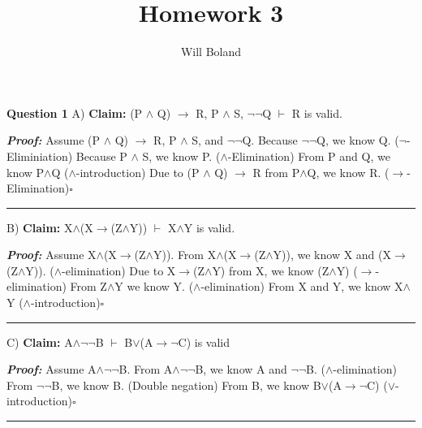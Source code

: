 \documentclass{article}
\begin{document}
\title{Homework 3}
\author{Will Boland}
\maketitle

\textbf{Question 1}\newline\newline
A) \textbf{Claim: } (P $\wedge$ Q) $\rightarrow$ R, P $\wedge$ S, $\neg$$\neg$Q $\vdash$ R is valid.\newline

\textbf{\textit{Proof: }}\newline
Assume (P $\wedge$ Q) $\rightarrow$ R, P $\wedge$ S, and $\neg$$\neg$Q.\newline
Because $\neg$$\neg$Q, we know Q. ($\neg$-Eliminiation)\newline
Because P $\wedge$ S, we know P. ($\wedge$-Elimination)\newline
From P and Q, we know P$\wedge$Q ($\wedge$-introduction)\newline
Due to (P $\wedge$ Q) $\rightarrow$ R from P$\wedge$Q, we know R. ($\rightarrow$-Elimination)$\square$\newline\rule{10cm}{1pt}\newline



B) \textbf{Claim: } X$\wedge$(X$\rightarrow$(Z$\wedge$Y)) $\vdash$ X$\wedge$Y is valid.\newline

\textbf{\textit{Proof: }}\newline
Assume X$\wedge$(X$\rightarrow$(Z$\wedge$Y)). \newline
From X$\wedge$(X$\rightarrow$(Z$\wedge$Y)), we know X and (X$\rightarrow$(Z$\wedge$Y)). ($\wedge$-elimination)\newline
Due to X$\rightarrow$(Z$\wedge$Y) from X, we know (Z$\wedge$Y) ($\rightarrow$-elimination)\newline
From Z$\wedge$Y we know Y. ($\wedge$-elimination)\newline
From X and Y, we know X$\wedge$Y ($\wedge$-introduction)$\square$\newline\rule{10cm}{1pt}\newline



C) \textbf{ Claim: } A$\wedge$$\neg$$\neg$B $\vdash$ B$\lor$(A$\rightarrow$$\neg$C) is valid\newline

\textbf{\textit{Proof: }}\newline
Assume A$\wedge$$\neg$$\neg$B. \newline
From A$\wedge$$\neg$$\neg$B, we know A and $\neg$$\neg$B. ($\wedge$-elimination)\newline
From $\neg$$\neg$B, we know B. (Double negation)\newline
From B, we know B$\lor$(A$\rightarrow$$\neg$C) ($\lor$-introduction)$\square$\newline\rule{10cm}{1pt}\newline
\end{document}
